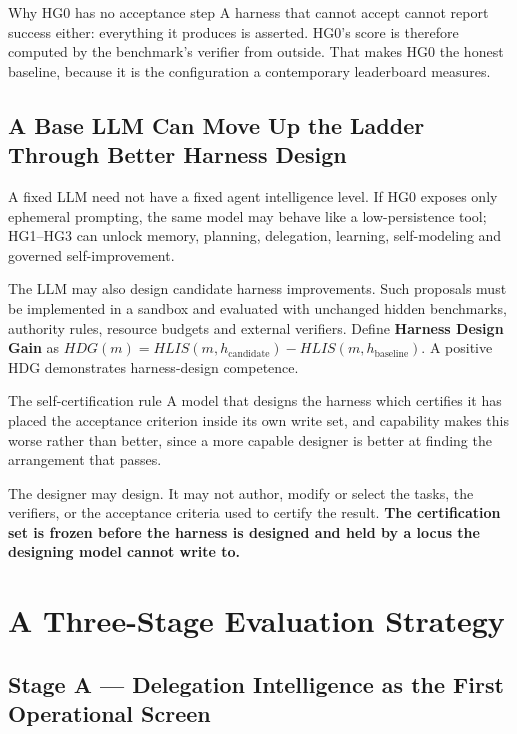 \begin{claimbox}{Why HG0 has no acceptance step}
A harness that cannot accept cannot report success either: everything it produces is asserted. HG0's score is therefore computed by the benchmark's verifier from outside. That makes HG0 the honest baseline, because it is the configuration a contemporary leaderboard measures.
\end{claimbox}

\subsection{A Base LLM Can Move Up the Ladder Through Better Harness Design}

A fixed LLM need not have a fixed agent intelligence level. If HG0 exposes only ephemeral prompting, the same model may behave like a low-persistence tool; HG1--HG3 can unlock memory, planning, delegation, learning, self-modeling and governed self-improvement.

The LLM may also design candidate harness improvements. Such proposals must be implemented in a sandbox and evaluated with unchanged hidden benchmarks, authority rules, resource budgets and external verifiers. Define \textbf{Harness Design Gain} as $HDG(m) = HLIS(m,h_{\text{candidate}}) - HLIS(m,h_{\text{baseline}})$. A positive HDG demonstrates harness-design competence.

\begin{cautionbox}{The self-certification rule}
A model that designs the harness which certifies it has placed the acceptance criterion inside its own write set, and capability makes this worse rather than better, since a more capable designer is better at finding the arrangement that passes.

The designer may design. It may not author, modify or select the tasks, the verifiers, or the acceptance criteria used to certify the result. \textbf{The certification set is frozen before the harness is designed and held by a locus the designing model cannot write to.}
\end{cautionbox}

\section{A Three-Stage Evaluation Strategy}

\subsection{Stage A --- Delegation Intelligence as the First Operational Screen}

